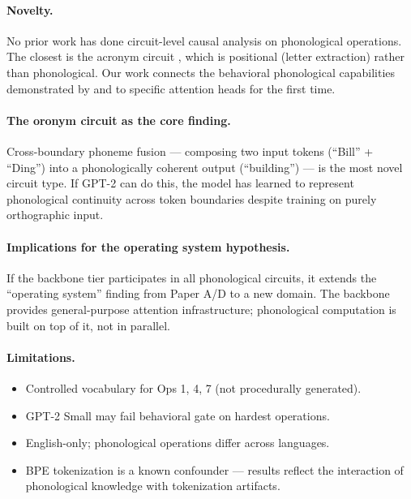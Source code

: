 \documentclass[11pt,a4paper]{article}
\begin{document}
\paragraph{Novelty.}
No prior work has done circuit-level causal analysis on phonological
operations. The closest is the acronym circuit \citep{garcia2024acronym},
which is positional (letter extraction) rather than phonological. Our work
connects the behavioral phonological capabilities demonstrated by
\citet{suvarna2024phonologybench} and \citet{liao2026tokenization} to specific
attention heads for the first time.

\paragraph{The oronym circuit as the core finding.}
Cross-boundary phoneme fusion --- composing two input tokens (``Bill'' +
``Ding'') into a phonologically coherent output (``building'') --- is the
most novel circuit type. If GPT-2 can do this, the model has learned to
represent phonological continuity across token boundaries despite training
on purely orthographic input.

\paragraph{Implications for the operating system hypothesis.}
If the backbone tier participates in all phonological circuits, it extends
the ``operating system'' finding from Paper A/D to a new domain. The backbone
provides general-purpose attention infrastructure; phonological computation is
built on top of it, not in parallel.

\paragraph{Limitations.}
\begin{itemize}[leftmargin=*,itemsep=2pt]
  \item Controlled vocabulary for Ops 1, 4, 7 (not procedurally generated).
  \item GPT-2 Small may fail behavioral gate on hardest operations.
  \item English-only; phonological operations differ across languages.
  \item BPE tokenization is a known confounder --- results reflect the
  interaction of phonological knowledge with tokenization artifacts.
\end{itemize}
\end{document}
